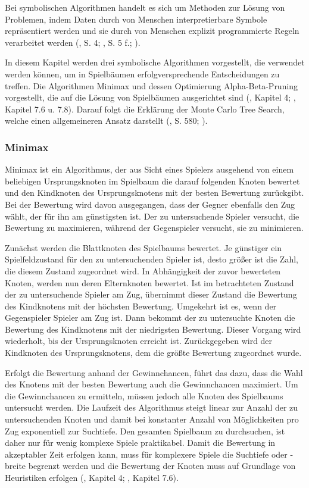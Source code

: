 \label{symbolische-algorithmen}

Bei symbolischen Algorithmen handelt es sich um Methoden zur Lösung von Problemen, indem Daten durch von Menschen interpretierbare Symbole repräsentiert werden und sie durch von Menschen explizit programmierte Regeln verarbeitet werden (\cite{Fergus.2022}, S. 4; \cite{Früh.2022}, S. 5 f.; \cite{Garnelo.2019}).

In diesem Kapitel werden drei symbolische Algorithmen vorgestellt, die verwendet werden können, um in Spielbäumen erfolgversprechende Entscheidungen zu treffen. Die Algorithmen Minimax und dessen Optimierung Alpha-Beta-Pruning vorgestellt, die auf die Lösung von Spielbäumen ausgerichtet sind (\cite{Ferguson.January2019}, Kapitel 4; \cite{Heineman.October2008}, Kapitel 7.6 u. 7.8). Darauf folgt die Erklärung der Monte Carlo Tree Search, welche einen allgemeineren Ansatz darstellt (\cite{Russell.2020}, S. 580; \cite{Swiechowski.2021}).

\subsubsection{Minimax}

Minimax ist ein Algorithmus, der aus Sicht eines Spielers ausgehend von einem beliebigen Ursprungsknoten im Spielbaum die darauf folgenden Knoten bewertet und den Kindknoten des Ursprungsknotens mit der besten Bewertung zurückgibt. Bei der Bewertung wird davon ausgegangen, dass der Gegner ebenfalls den Zug wählt, der für ihn am günstigsten ist. Der zu untersuchende Spieler versucht, die Bewertung zu maximieren, während der Gegenspieler versucht, sie zu minimieren.

Zunächst werden die Blattknoten des Spielbaums bewertet. Je günstiger ein Spielfeldzustand für den zu untersuchenden Spieler ist, desto größer ist die Zahl, die diesem Zustand zugeordnet wird. In Abhängigkeit der zuvor bewerteten Knoten, werden nun deren Elternknoten bewertet. Ist im betrachteten Zustand der zu untersuchende Spieler am Zug, übernimmt dieser Zustand die Bewertung des Kindknotens mit der höchsten Bewertung. Umgekehrt ist es, wenn der Gegenspieler Spieler am Zug ist. Dann bekommt der zu untersuchte Knoten die Bewertung des Kindknotens mit der niedrigsten Bewertung. Dieser Vorgang wird wiederholt, bis der Ursprungsknoten erreicht ist. Zurückgegeben wird der Kindknoten des Ursprungsknotens, dem die größte Bewertung zugeordnet wurde.

Erfolgt die Bewertung anhand der Gewinnchancen, führt das dazu, dass die Wahl des Knotens mit der besten Bewertung auch die Gewinnchancen maximiert. Um die Gewinnchancen zu ermitteln, müssen jedoch alle Knoten des Spielbaums untersucht werden. Die Laufzeit des Algorithmus steigt linear zur Anzahl der zu untersuchenden Knoten und damit bei konstanter Anzahl von Möglichkeiten pro Zug exponentiell zur Suchtiefe. Den gesamten Spielbaum zu durchsuchen, ist daher nur für wenig komplexe Spiele praktikabel. Damit die Bewertung in akzeptabler Zeit erfolgen kann, muss für komplexere Spiele die Suchtiefe oder -breite begrenzt werden und die Bewertung der Knoten muss auf Grundlage von Heuristiken erfolgen (\cite{Ferguson.January2019}, Kapitel 4; \cite{Heineman.October2008}, Kapitel 7.6).

